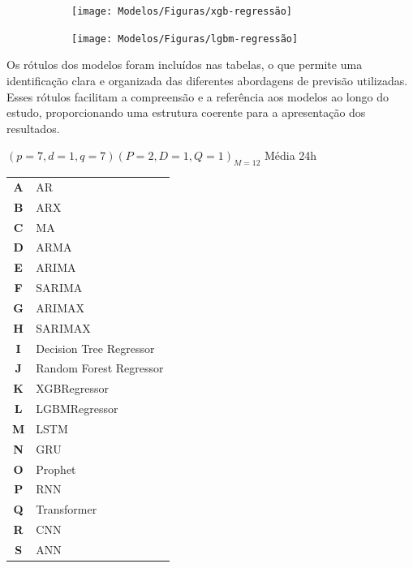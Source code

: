 \begin{figure}[H]
	\centering
	\caption{Resultados da regressão utilizando XGBoost e LightGBM \label{fig:xgb}\label{fig:lgb}}
	\label{fig:1-xgb-regressao}
	
	\begin{subfigure}{1\textwidth}
			\texttt{[image: Modelos/Figuras/xgb-regressão]}
			
		\end{subfigure}\hfill
	\begin{subfigure}{1\textwidth}
			\texttt{[image: Modelos/Figuras/lgbm-regressão]}
			
		\end{subfigure}
	


\end{figure}	



Os rótulos dos modelos foram incluídos nas tabelas, o que permite uma identificação clara e organizada das diferentes abordagens de previsão utilizadas. Esses rótulos facilitam a compreensão e a referência aos modelos ao longo do estudo, proporcionando uma estrutura coerente para a apresentação dos resultados.

$(p = 7,d = 1,q = 7) (P = 2,D = 1,Q = 1)_{M = 12}$ Média 24h
 
\begin{table}[!htb]
	\begin{tabular}{cl}
			\textbf{A} & AR                      \\
			\textbf{B} & ARX                     \\
			\textbf{C} & MA                      \\
			\textbf{D} & ARMA                    \\
			\textbf{E} & ARIMA                   \\
			\textbf{F} & SARIMA                  \\
			\textbf{G} & ARIMAX                  \\
			\textbf{H} & SARIMAX                 \\
			\textbf{I} & Decision Tree Regressor  \\
			\textbf{J} & Random Forest Regressor \\
			\textbf{K} & XGBRegressor            \\
			\textbf{L} & LGBMRegressor           \\
			\textbf{M} & LSTM                    \\
			\textbf{N} & GRU                     \\
			\textbf{O} & Prophet                 \\
			\textbf{P} & RNN                     \\
			\textbf{Q} & Transformer            \\
			\textbf{R} & CNN\\
			\textbf{S} & ANN
			
		\end{tabular}
\end{table}



